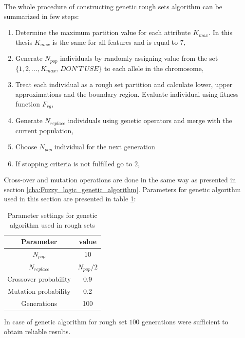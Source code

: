 The whole procedure of constructing genetic rough sets algorithm can be summarized in few steps:
\begin{enumerate}
    \item Determine the maximum partition value for each attribute $K_{max}$. In
        this thesis $K_{max}$ is the same for all features and is equal to 7, 
    \item Generate $N_{pop}$ individuals by randomly assigning value from the
        set $\{1, 2, \ldots, K_{max}, \, DON'T\; USE\}$ to each allele in the
        chromosome,
    \item Treat each individual as a rough set partition and calculate lower,
        upper approximations and the boundary region. Evaluate individual using
        fitness function $F_{rg}$,
    \item Generate $N_{replace}$ individuals using genetic operators and merge
        with the current population,
    \item Choose $N_{pop}$ individual for the next generation
    \item If stopping criteria is not fulfilled go to $2$,
\end{enumerate}
Cross-over and mutation operations are done in the same way as presented in
section \ref{cha:Fuzzy_logic_genetic_algorithm}. Parameters for genetic algorithm 
used in this section are presented in table \ref{tab:rough_genetic_parameters}:
\begin{table}[H]
    \caption{Parameter settings for genetic algorithm used in rough sets}
    \centering
    \begin{tabular}{|c|c|}
        \hline
        Parameter & value \\ \hline \hline
        $N_{pop}$ & 10 \\ \hline
        $N_{replace}$ & $N_{pop}/2$ \\ \hline
        Crossover probability & 0.9 \\ \hline
        Mutation probability & 0.2 \\ \hline
        Generations & 100 \\ \hline
    \end{tabular}
    \label{tab:rough_genetic_parameters}
\end{table}
In case of genetic algorithm for rough set $100$ generations were sufficient to
obtain reliable results.
